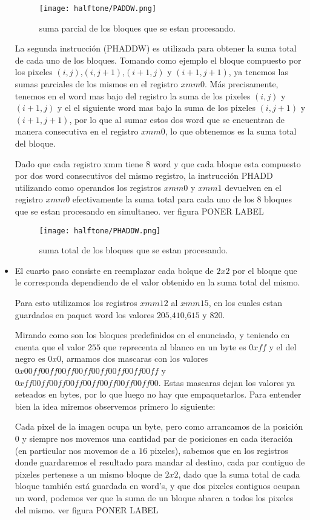 \begin{itemize}
	\begin{figure}[H]
		\centering
		\texttt{[image: halftone/PADDW.png]}
		\caption{suma parcial de los bloques que se estan procesando.}
		\label{PADDW}
	\end{figure}


	La segunda instrucción (PHADDW) es utilizada para obtener la suma total de cada uno de los bloques. Tomando como ejemplo el bloque compuesto por los pixeles $(i,j)$,$(i,j+1)$,$(i+1,j)$ y $(i+1,j+1)$, ya tenemos las sumas parciales de los mismos en el registro $xmm0$. Más precisamente, tenemos en el word mas bajo del registro la suma de los pixeles $(i,j)$ y $(i+1,j)$ y el el siguiente word mas bajo la suma de los pixeles $(i,j+1)$ y $(i+1,j+1)$, por lo que al sumar estos dos word que se encuentran de manera consecutiva en el registro $xmm0$, lo que obtenemos es la suma total del bloque. 

	Dado que cada registro xmm tiene $8$ word y que cada bloque esta compuesto por dos word consecutivos del mismo registro, la instrucción PHADD utilizando como operandos los registros $xmm0$ y $xmm1$ devuelven en el registro $xmm0$ efectivamente la suma total para cada uno de los $8$ bloques que se estan procesando en simultaneo. ver figura PONER LABEL

	\begin{figure}[H]
		\centering
		\texttt{[image: halftone/PHADDW.png]}
		\caption{suma total de los bloques que se estan procesando.}
		\label{PHADDW}
	\end{figure}

	\item El cuarto paso consiste en reemplazar cada bolque de $2x2$ por el bloque que le corresponda dependiendo de el valor obtenido en la suma total del mismo.

	Para esto utilizamos los registros $xmm12$ al $xmm15$, en los cuales estan guardados en paquet word los valores $205$,$410$,$615$ y $820$.

	Mirando como son los bloques predefinidos en el enunciado, y teniendo en cuenta que el valor $255$ que reprecenta al blanco en un byte es $0xff$ y el del negro es $0x0$, armamos dos mascaras con los valores $0x00ff00ff00ff00ff00ff00ff00ff00ff$ y $0xff00ff00ff00ff00ff00ff00ff00ff00$. Estas mascaras dejan los valores ya seteados en bytes, por lo que luego no hay que empaquetarlos.
	Para entender bien la idea miremos observemos primero lo siguiente:

	Cada pixel de la imagen ocupa un byte, pero como arrancamos de la posición $0$ y siempre nos movemos una cantidad par de posiciones en cada iteración (en particular nos movemos de a $16$ pixeles), sabemos que en los registros donde guardaremos el resultado para mandar al destino, cada par contiguo de pixeles pertenese a un mismo bloque de $2x2$, dado que la suma total de cada bloque también está guardada en word's, y que dos pixeles contiguos ocupan un word, podemos ver que la suma de un bloque abarca a todos los pixeles del mismo. ver figura PONER LABEL


\end{itemize}
